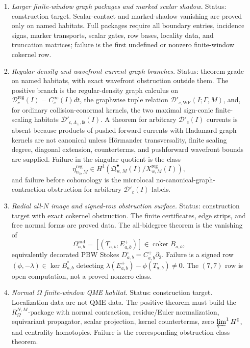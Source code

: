 \begin{enumerate}
  \item \emph{Larger finite-window graph packages and marked scalar
  shadow.}
  Status: construction target.  Scalar-contact and marked-shadow
  vanishing are proved only on named habitats.  Full packages require
  all boundary entries, incidence signs, marker transports, scalar gates,
  row bases, locality data, and truncation matrices; failure is the first
  undefined or nonzero finite-window cokernel row.

  \item \emph{Regular-density and wavefront-current graph branches.}
  Status: theorem-grade on named habitats, with exact wavefront
  obstruction outside them.  The positive branch is the regular-density
  graph calculus on
  \(\mathcal D^{\mathrm{reg}}_c(I)=C_c^\infty(I)dt\), the graphwise tuple
  relation \(\mathcal D'_{c,\mathrm{WF}}(I;\Gamma,M)\), and, for ordinary
  collision-conormal kernels, the two maximal sign-conic finite-scaling
  habitats \(\mathcal D'_{c,\Lambda_\pm,\mathrm{fs}}(I)\).  A theorem for
  arbitrary \(\mathcal D'_c(I)\) currents is absent because products of
  pushed-forward currents with Hadamard graph kernels are not canonical
  unless H\"ormander transversality, finite scaling degree, diagonal
  extension, counterterms, and pushforward wavefront bounds are supplied.
  Failure in the singular quotient is the class
  \[
    \eta^{\mathrm{reg}}_{n_0,M}\in
    H^1(\mathfrak Q^\bullet_{w,M}(I)/X^{\mathrm{reg}}_{w,M}(I)),
  \]
  and failure before cohomology is the microlocal
  no-canonical-graph-contraction obstruction for arbitrary
  \(\mathcal D'_c(I)\)-labels.

  \item \emph{Radial all-\(N\) image and signed-row obstruction surface.}
  Status: construction target with exact cokernel obstruction.  The
  finite certificates, edge strips, and free normal forms are proved
  data.  The all-bidegree theorem is the vanishing of
  \[
    \Omega^{\mathrm{rad}}_{a,b}
    =
    [(T_{a,b},E^+_{a,b})]\in\operatorname{coker}B_{a,b},
  \]
  equivalently decorated PBW Stokes
  \(D^\square_{a,b}=C^+_{a,b}\partial_2\).  Failure is a signed row
  \((\phi,-\lambda)\in\ker B_{a,b}^*\) detecting
  \(\lambda(E^+_{a,b})-\phi(T_{a,b})\ne0\).  The \((7,7)\) row is open
  computation, not a proved nonzero class.

  \item \emph{Normal \(\Omega\) finite-window QME habitat.}
  Status: construction target.  Localization data are not QME data.  The
  positive theorem must build the \(R_\Omega^{N,M}\)-package with normal
  contraction, residue/Euler normalization, equivariant propagator,
  scalar projection, kernel counterterms, zero \(\varprojlim^1H^0\), and
  centrality homotopies.  Failure is the corresponding obstruction-class
  theorem.


\end{enumerate}
